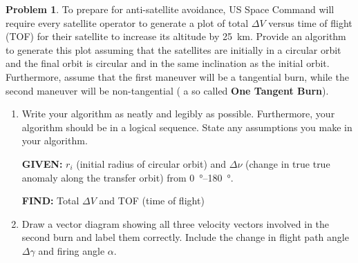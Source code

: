 \documentclass[10pt]{article}
\theoremstyle{definition}
\newtheorem{prob}{Problem}[section]
\newenvironment{subprob}%
{\renewcommand{\theenumi}{\alph{enumi}}\renewcommand{\labelenumi}{(\theenumi)}\begin{enumerate}}%
{\end{enumerate}}%
\newcommand{\extrapage}{\clearpage\newpage\null\newpage}
\begin{document}
\extrapage
\extrapage

\begin{prob}
    To prepare for anti-satellite avoidance, US Space Command will require every satellite operator to generate a plot of total \( \Delta V \) versus time of flight (TOF) for their satellite to increase its altitude by \SI{25}{\kilo\meter}. 
    Provide an algorithm to generate this plot assuming that the satellites are initially in a circular orbit and the final orbit is circular and in the same inclination as the initial orbit. 
    Furthermore, assume that the first maneuver will be a tangential burn, while the second maneuver will be non-tangential ( a so called \textbf{One Tangent Burn}).

    \begin{subprob}
    \item Write your algorithm as neatly and legibly as possible.
        Furthermore, your algorithm should be in a logical sequence. 
        State any assumptions you make in your algorithm.

        \textbf{GIVEN:} \( r_i\) (initial radius of circular orbit) and \( \Delta \nu\) (change in true true anomaly along the transfer orbit) from \SIrange{0}{180}{\degree}.

        \textbf{FIND:} Total \( \Delta V\) and TOF (time of flight)
        
    \item Draw a vector diagram showing all three velocity vectors involved in the second burn and label them correctly.
        Include the change in flight path angle \( \Delta \gamma \) and firing angle \( \alpha \).
    \end{subprob} 
\end{prob}    

\extrapage
\extrapage
\end{document}
